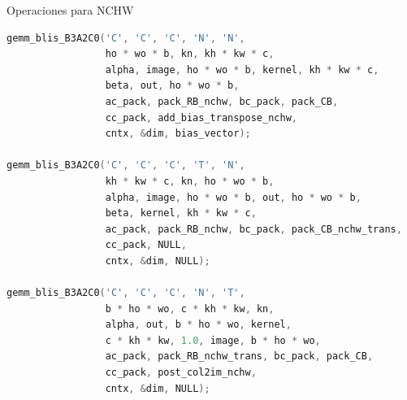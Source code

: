 \documentclass[aspectratio=43]{beamer}
\newcommand{\subsectiontoc}[1]{
    \subsection{#1}
    \begin{frame}%
    \tableofcontents[currentsubsection]
    \end{frame}
}
\begin{document}
\begin{frame}[fragile]{Operaciones para NCHW}
\begin{lstlisting}[language=C,basicstyle=\scriptsize\ttfamily]
gemm_blis_B3A2C0('C', 'C', 'C', 'N', 'N',
                 ho * wo * b, kn, kh * kw * c,
                 alpha, image, ho * wo * b, kernel, kh * kw * c,
                 beta, out, ho * wo * b,
                 ac_pack, pack_RB_nchw, bc_pack, pack_CB,
                 cc_pack, add_bias_transpose_nchw,
                 cntx, &dim, bias_vector);

gemm_blis_B3A2C0('C', 'C', 'C', 'T', 'N',
                 kh * kw * c, kn, ho * wo * b,
                 alpha, image, ho * wo * b, out, ho * wo * b,
                 beta, kernel, kh * kw * c,
                 ac_pack, pack_RB_nchw, bc_pack, pack_CB_nchw_trans,
                 cc_pack, NULL,
                 cntx, &dim, NULL);

gemm_blis_B3A2C0('C', 'C', 'C', 'N', 'T',
                 b * ho * wo, c * kh * kw, kn,
                 alpha, out, b * ho * wo, kernel,
                 c * kh * kw, 1.0, image, b * ho * wo,
                 ac_pack, pack_RB_nchw_trans, bc_pack, pack_CB,
                 cc_pack, post_col2im_nchw,
                 cntx, &dim, NULL);
\end{lstlisting}
\end{frame}


\begin{frame}%
\end{frame}

\begin{frame}%
\end{frame}

\begin{frame}%
\end{frame}
\end{document}
